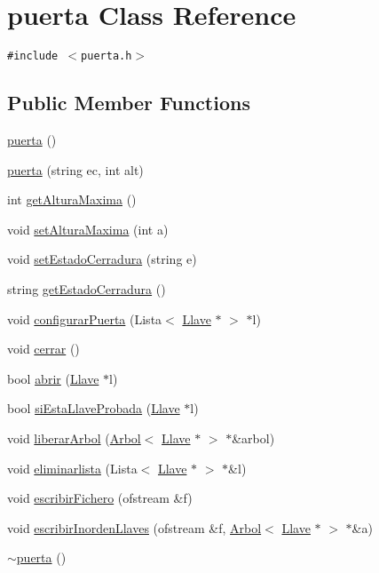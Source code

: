 \hypertarget{classpuerta}{
\section{puerta Class Reference}
\label{classpuerta}
}
{\tt \#include $<$puerta.h$>$}

\subsection*{Public Member Functions}
\begin{CompactItemize}
\item 
\hyperlink{classpuerta_dae189c1b2be845ba10b3335e4c3b91d}{puerta} ()
\item 
\hyperlink{classpuerta_237f56c4736c97891edb19aeee750ed2}{puerta} (string ec, int alt)
\item 
int \hyperlink{classpuerta_facb52e11a8a2b23437d4d0821187edc}{getAlturaMaxima} ()
\item 
void \hyperlink{classpuerta_4dbec0518d2dfbf78e636ea18352cfe1}{setAlturaMaxima} (int a)
\item 
void \hyperlink{classpuerta_c7020654ddeefc2cdfd937fd5d3f6749}{setEstadoCerradura} (string e)
\item 
string \hyperlink{classpuerta_3c87fcb19f24d5348db587f0c6a9b27d}{getEstadoCerradura} ()
\item 
void \hyperlink{classpuerta_fc919a28f4751159e5109ec43e691e0e}{configurarPuerta} (Lista$<$ \hyperlink{classLlave}{Llave} $\ast$ $>$ $\ast$l)
\item 
void \hyperlink{classpuerta_8c3078b9245cb0fbc37e7f1b662be74b}{cerrar} ()
\item 
bool \hyperlink{classpuerta_a70c9e4a8a59555d1ba15caff7849497}{abrir} (\hyperlink{classLlave}{Llave} $\ast$l)
\item 
bool \hyperlink{classpuerta_9f108f67092846743458195fca60d6ca}{siEstaLlaveProbada} (\hyperlink{classLlave}{Llave} $\ast$l)
\item 
void \hyperlink{classpuerta_d4d085f48f3b014afbba4113510b63d8}{liberarArbol} (\hyperlink{classArbol}{Arbol}$<$ \hyperlink{classLlave}{Llave} $\ast$ $>$ $\ast$\&arbol)
\item 
void \hyperlink{classpuerta_e2bcee3940c85671615c2331bba3b755}{eliminarlista} (Lista$<$ \hyperlink{classLlave}{Llave} $\ast$ $>$ $\ast$\&l)
\item 
void \hyperlink{classpuerta_db48cb6b90ccdc012aa488850ac458b1}{escribirFichero} (ofstream \&f)
\item 
void \hyperlink{classpuerta_be41e285663cf9f509e6fe0583ba4202}{escribirInordenLlaves} (ofstream \&f, \hyperlink{classArbol}{Arbol}$<$ \hyperlink{classLlave}{Llave} $\ast$ $>$ $\ast$\&a)
\item 
\hyperlink{classpuerta_207e0983ca66391ee628453dffcf619f}{$\sim$puerta} ()
\end{CompactItemize}
